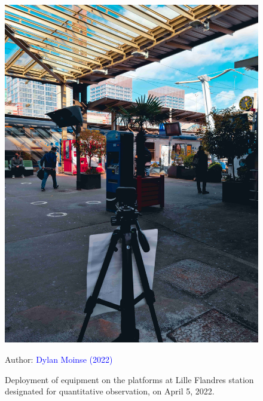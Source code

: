 \begin{refsegment}
\begin{figure}[h!]\vspace*{4pt}
    \caption{Deployment of equipment on the platforms at Lille Flandres station designated for quantitative observation, on April 5, 2022.}
    \label{fig-chap3:materiel-observation-quantitative}
    \centerline{\includegraphics[width=0.5\columnwidth]{src/Figures/Chap-3/EN_Observation_Camera_Lille_Flandres.jpg}}
    \vspace{5pt}
    \begin{flushright}\scriptsize{
    Author: \textcolor{blue}{Dylan Moinse (2022)}
    }\end{flushright}
\end{figure}


\end{refsegment}
